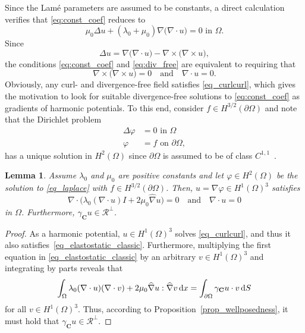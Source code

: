 \documentclass[reqno]{amsart}
\numberwithin{equation}{section}
\numberwithin{figure}{section}
\numberwithin{table}{section}
\theoremstyle{definition}
\theoremstyle{plain}
\newtheorem{lem}[thm]{Lemma}
\theoremstyle{definition}
\theoremstyle{remark}
\numberwithin{equation}{section}
\begin{document}
Since the Lam\'e parameters are assumed to be constants, a direct calculation verifies that \eqref{eq:const_coef} reduces to
%
\begin{equation*}
	\mu_0 \Delta u + (\lambda_0 + \mu_0) \nabla \bigl(\nabla \cdot u\bigr) = 0  \text{ in } \Omega.
\end{equation*}
%
Since 
%
\begin{equation*}
	\Delta u  = \nabla \bigl(\nabla \cdot u\bigr) - \nabla \times \bigl(\nabla \times u\bigr), 
\end{equation*}
% 
the conditions \eqref{eq:const_coef} and \eqref{eq:div_free} are equivalent to requiring that
%
\begin{equation} \label{eq_curlcurl}
	\nabla \times \bigl(\nabla \times u\bigr) = 0 \quad \text{and} \quad \nabla \cdot u = 0.
\end{equation}
%
Obviously, any curl- and divergence-free field satisfies \eqref{eq_curlcurl}, which gives the motivation to look for suitable divergence-free solutions to \eqref{eq:const_coef} as gradients of harmonic potentials. To this end, consider $f \in H^{3/2}(\partial \Omega)$ and note that the Dirichlet problem
%
\begin{equation} \label{eq_laplace}
	\begin{split}
		\Delta \varphi &= 0  \text{ in } \Omega \\
		\varphi &= f  \text{ on } \partial\Omega,
	\end{split}
\end{equation}
%
has a unique solution in $H^2(\Omega)$ since $\partial \Omega$ is assumed to be of class $C^{1,1}$~\cite{Grisvard85}.

\begin{lem} \label{lem_Laplace_to_elastostatic}
	Assume $\lambda_0$ and $\mu_0$ are positive constants and let $\varphi \in H^2(\Omega)$ be the solution to \eqref{eq_laplace} with $f \in H^{3/2}(\partial \Omega)$. Then, $u = \nabla \varphi \in H^1(\Omega)^3$ satisfies
	\begin{equation} \label{eq_elastostatic_classic}
		\nabla \cdot \big(\lambda_0 (\nabla \cdot u) I + 2 \mu_0 \widehat{\nabla} u  \big) = 0 \quad \text{and} \quad \nabla \cdot u =0
	\end{equation}
	in $\Omega$. Furthermore, $\gamma_{\mathbf C} u \in \mathcal{R}^\perp$.
\end{lem}

\begin{proof}
    As a harmonic potential, $u \in H^1(\Omega)^3$ solves \eqref{eq_curlcurl}, and thus it also satisfies~\eqref{eq_elastostatic_classic}. Furthermore, multiplying the first equation in \eqref{eq_elastostatic_classic} by an arbitrary $v \in H^1(\Omega)^3$ and integrating by parts reveals that
    \begin{align*}  
		\int_\Omega \lambda_0 (\nabla \cdot u) (\nabla \cdot v) + 2 \mu_0 \widehat{\nabla} u :\widehat{\nabla} v \, {\rm d}x = \int_{ \partial\Omega} \gamma_{\mathbf C} u \cdot v \,{\rm d}S 
	\end{align*}
	for all $v \in H^1(\Omega)^3$. Thus, according to Proposition~\ref{prop_wellposedness}, it must hold that $\gamma_{\mathbf C} u \in \mathcal{R}^\perp$.
\end{proof}
\end{document}
